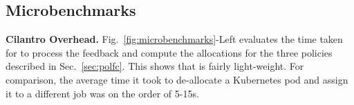 
\insertFigMicrobenchmarks

%

\subsection{Microbenchmarks}
\label{sec:microbenchmarks}


\textbf{Cilantro Overhead.}
Fig.~\ref{fig:microbenchmarks}-Left evaluates the time taken for \cilantros to process the feedback
and compute the allocations for the three policies described in Sec.~\ref{sec:polfc}.
This shows that \cilantros is fairly light-weight.
For comparison, the average time it took to de-allocate a Kubernetes pod and assign it to a
different job was on the order of 5-15s.



